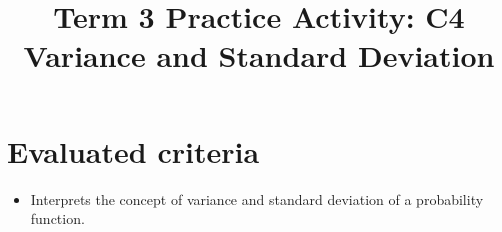 \makeatletter
{}
\makeatother	


\usepackage{pgfplots}
\pgfplotsset{compat=1.18}

\title{Term 3 Practice Activity: C4 Variance and Standard Deviation}
\author{}
\date{}


	\maketitle

	\setcounter{tocdepth}{1}
	\setcounter{secnumdepth}{2}
	\tableofcontents

	\section*{Evaluated criteria}
	\begin{itemize}
		\item [C4] Interprets the concept of variance and standard deviation of a probability function.
	\end{itemize}
	
	
\newcommand{\UniformMeanSDGraph}[9]{%
	\begin{center}
		\begin{tikzpicture}
			\pgfmathsetmacro{\BlueHeight}{1/((#9)-(#5))}
			\pgfmathsetmacro{\ShadeHeight}{\BlueHeight}
			\pgfmathsetmacro{\GuideHeight}{0.8*(#4)}
			\pgfmathsetmacro{\MeanLineHeight}{0.97*(#4)}
			\begin{axis}[
				width=10cm,
				height=5.5cm,
				axis lines=left,
				xlabel={$#1$},
				xlabel style={at={(axis description cs:1.02,-0.06)}, anchor=north west},
				ylabel={$f(#1)$},
				xmin=#2,
				xmax=#3,
				ymin=0,
				ymax=#4,
				grid=both,
				xtick={#5,#6,#7,#8,#9},
				xticklabels={$#5$,,{$E[#1]=#7$},,{$#9$}},
				ytick=\empty
				]
				\addplot[ultra thick, blue]
				coordinates {(#5,0) (#5,\BlueHeight) (#9,\BlueHeight) (#9,0)};
				
				\addplot[ultra thick, orange]
				coordinates {(#7,0) (#7,\MeanLineHeight)};
				
				\addplot[red, densely dotted, thick]
				coordinates {(#6,0) (#6,\GuideHeight)};
				
				\addplot[red, densely dotted, thick]
				coordinates {(#8,0) (#8,\GuideHeight)};
				
				\addplot[draw=none, fill=red, fill opacity=0.5]
				coordinates {(#6,0) (#6,\ShadeHeight) (#8,\ShadeHeight) (#8,0)}
				\closedcycle;
				
				\node[font=\small, above] at (axis cs:#6,\GuideHeight) {$E[#1]-\sigma$};
				\node[font=\small, above] at (axis cs:#8,\GuideHeight) {$E[#1]+\sigma$};
			\end{axis}
		\end{tikzpicture}
	\end{center}
}



